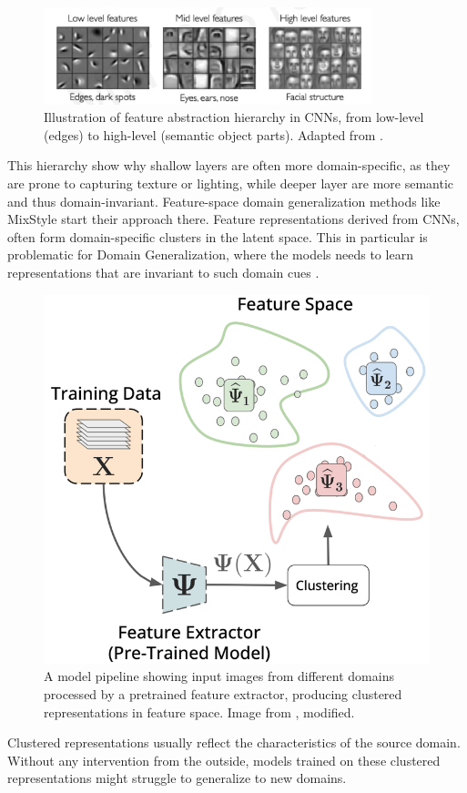 \begin{figure}[ht]
    \centering
    \includegraphics[width=0.85\textwidth]{images/Learning-Feature-Representation.png}
    \caption{Illustration of feature abstraction hierarchy in CNNs, from low-level (edges) to high-level (semantic object parts). Adapted from \cite{alexanderaminiMITIntroductionDeep2025}.}
    \label{fig:Hierarchy_of_Features}
\end{figure}
This hierarchy show why shallow layers are often more domain-specific, as they are prone to capturing texture or lighting, while deeper layer are more semantic and thus domain-invariant. Feature-space domain generalization methods like MixStyle \citep{zhouMixStyleNeuralNetworks2023} start their approach there.
Feature representations derived from CNNs, often form domain-specific clusters in the latent space. This in particular is problematic for Domain Generalization, where the models needs to learn representations that are invariant to such domain cues \citep{zhouDomainGeneralizationSurvey2022}.

\begin{figure}[!htb]
    \centering
    \includegraphics[height=0.33\textheight]{images/Pipeline-Feature_Space.png}
    \caption{A model pipeline showing input images from different domains processed by a pretrained feature extractor, producing clustered representations in feature space. Image from \cite{thomasWhatsLatentLeveraging2025}, modified.}
    \label{fig:Pipeline_Feature_Space}
\end{figure}
Clustered representations usually reflect the characteristics of the source domain. Without any intervention from the outside, models trained on these clustered representations might struggle to generalize to new domains.

